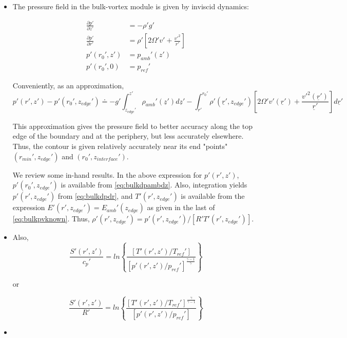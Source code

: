 \documentclass[preprint, prX]{revtex4}
\newcommand{\cbfrac}[2]{\left\{\frac{#1}{#2}\right\}}
\newcommand{\pd}[2]{\frac{\partial#1}{\partial#2}}
\newcommand{\gogmo}{\frac{\gamma}{\gamma-1}}
\newcommand{\rmin}{r_{min}}
\newcommand{\zedge}{z_{edge}}
\newcommand{\zinter}{z_{interface}}
\begin{document}
\begin{itemize}
\item The pressure field in the bulk-vortex module is given by inviscid dynamics:

\begin{equation}
\begin{split}
	\pd{ p'}{ z'} &= -\rho' g' \\
	\pd{ p'}{ r'} & = \rho'\left[ 2\Omega' v' + \frac{v'^2}{r'} \right ]\\
	p'(r_0',z') &= p_{amb}'(z') \\
	p'(r_0',0) &= p_{ref}'
\end{split}
\end{equation}

Conveniently, as an approximation,
\begin{equation}
	p'(r',z') - p'(r_0', \zedge') \doteq -g' \int_{\zedge'}^{z'} \rho_{amb}'(\underline{z}') d\underline{z}' - \int_{r'}^{r_0'} \rho'(\underline{r}', \zedge') \left[ 2\Omega'v'(\underline{r}') + \frac{v'^2(\underline{r}')}{\underline{r}'}\right] d\underline{r}'
\end{equation}

This approximation gives the pressure field to better accuracy along the top edge of the boundary and at the periphery, but less accurately elsewhere. Thus, the contour is given relatively accurately near its end "points" $(\rmin', \zedge')$ and $(r_0', \zinter')$.

We review some in-hand results. In the above expression for $p'(r',z')$, $p'(r_0', \zedge')$ is available from \eqref{eq:bulkdpambdz}. Also, integration yields $p'(r',\zedge')$ from \eqref{eq:bulkdpdr}, and $T'(r',\zedge')$ is available from the expression $E'(r',\zedge') = E_{amb}'(\zedge)$ as given in the last of \eqref{eq:bulkpvknown}. Thus, $\rho'(r',\zedge') = p'(r',\zedge')/[R' T'(r',\zedge')]$.

\item Also, 
\begin{equation}
	\frac{S'(r',z')}{c_p'} = ln \cbfrac{ \left[ T'(r',z')/T_{ref}'\right] }{\left[ p'(r',z')/p_{ref}' \right]^\frac{\gamma-1}{\gamma} }
\end{equation}

or

\begin{equation}
	\frac{S'(r',z')}{R'} = ln \cbfrac{ \left[ T'(r',z')/T_{ref}'\right]^\gogmo }{\left[ p'(r',z')/p_{ref}' \right] }
\end{equation}

\item 


\end{itemize}
\end{document}
